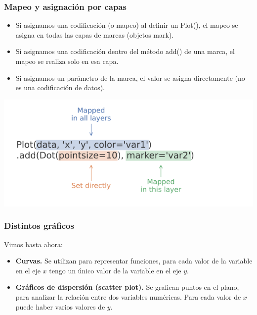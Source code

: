 \documentclass[aspectratio=169,12pt]{beamer}
\begin{document}

\begin{frame}
\frametitle{Mapeo y asignación por capas}

\begin{itemize}
\item Si asignamos una codificación (o mapeo) al definir un Plot(),
el mapeo se asigna en todas las capas de marcas (objetos mark).
\item Si asignamos una codificación dentro del método add() de una marca, el mapeo se realiza solo en esa capa.
\item Si asignamos un parámetro de la marca, el valor se asigna directamente (no es una codificación de datos).
\end{itemize}

\begin{center}
\includegraphics[scale=0.40]{practica3-img-mappings.png}
\end{center}

\end{frame}



\begin{frame}
\frametitle{Distintos gráficos}

Vimos hasta ahora:

\begin{itemize}
\item \textbf{Curvas.} Se utilizan para representar funciones, para cada valor de la variable en el eje $x$ tengo un único valor de la variable en el eje $y$.
\item \textbf{Gráficos de dispersión (scatter plot).} Se grafican puntos en el plano, para analizar la relación entre dos variables numéricas. Para cada valor de $x$ puede haber varios valores de $y$.
\end{itemize}

\end{frame}
\end{document}
